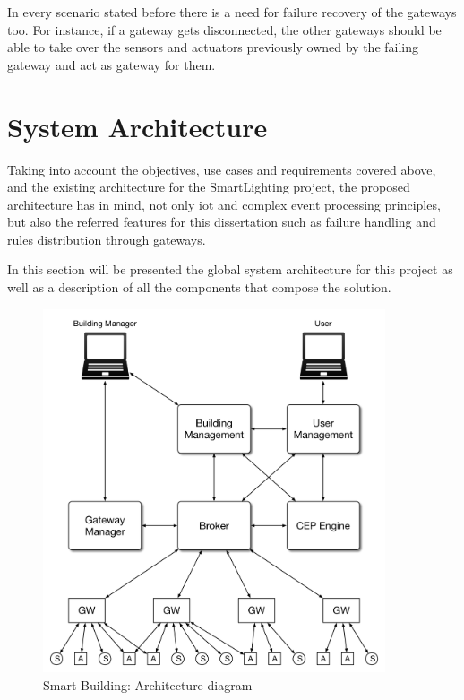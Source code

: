 In every scenario stated before there is a need for failure recovery of the gateways too. For instance, if a gateway gets disconnected, the other gateways should be able to take over the sensors and actuators previously owned by the failing gateway and act as gateway for them.

\section{System Architecture}
\label{Architecture:Architecture}


Taking into account the objectives, use cases and requirements covered above, and the existing architecture for the SmartLighting project, the proposed architecture has in mind, not only \ac{iot} and complex event processing principles, but also the referred features for this dissertation such as failure handling and rules distribution through gateways.

In this section will be presented the global system architecture for this project as well as a description of all the components that compose the solution.

\begin{figure}[H]
	\centering
	\includegraphics[width=0.9\textwidth]{figures/architecture.png}
	\caption{Smart Building: Architecture diagram}
	\label{fig:arch}
\end{figure}



